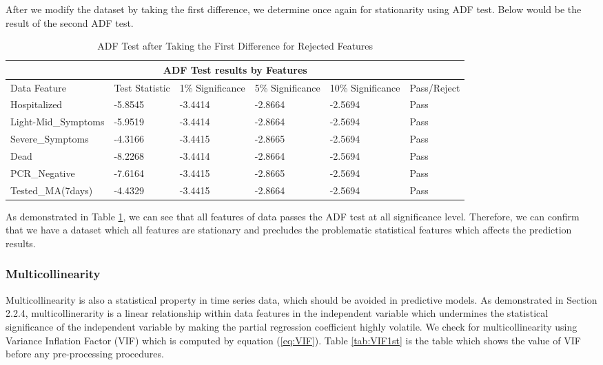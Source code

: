 After we modify the dataset by taking the first difference, we determine once again for stationarity using ADF test. Below would be the result of the second ADF test. 
\begin{table}[ht]
\centering
\caption{\label{tab:ADF2nd}ADF Test after Taking the First Difference for Rejected Features}
\begin{tabular}{ |p{4cm}||p{1.7cm}|p{1.7cm}|p{1.7cm}|p{1.7cm}|p{2.5cm}| }
 \hline
 \multicolumn{6}{|c|}{ADF Test results by Features} \\
 \hline
 Data Feature & Test Statistic & 1\% Significance & 5\% Significance & 10\% Significance & Pass/Reject\\
 \hline
Hospitalized & -5.8545 & -3.4414 & -2.8664 & -2.5694 & Pass \\
Light-Mid\_Symptoms & -5.9519 & -3.4414 & -2.8664 & -2.5694 & Pass \\
Severe\_Symptoms & -4.3166 & -3.4415 & -2.8665 & -2.5694 & Pass \\
Dead & -8.2268 & -3.4414 & -2.8664 & -2.5694 & Pass \\
PCR\_Negative & -7.6164 & -3.4415 & -2.8665 & -2.5694 & Pass \\
Tested\_MA(7days) & -4.4329 & -3.4415 & -2.8664 & -2.5694 & Pass \\
 \hline
\end{tabular}
\end{table}

As demonstrated in Table \ref{tab:ADF2nd}, we can see that all features of data passes the ADF test at all significance level. Therefore, we can confirm that we have a dataset which all features are stationary and precludes the problematic statistical features which affects the prediction results. 

\subsubsection{Multicollinearity}
Multicollinearity is also a statistical property in time series data, which should be avoided in predictive models. As demonstrated in Section 2.2.4, multicollinerarity is a linear relationship within data features in the independent variable which undermines the statistical significance of the independent variable by making the partial regression coefficient highly volatile. We check for multicollinearity using Variance Inflation Factor (VIF) which is computed by equation (\ref{eq:VIF}). Table \ref{tab:VIF1st} is the table which shows the value of VIF before any pre-processing procedures.  

